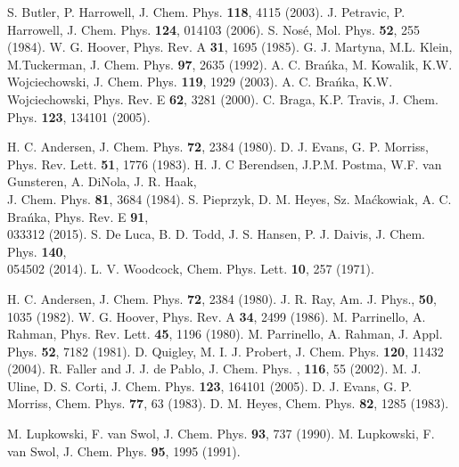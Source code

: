 \begin{thebibliography}{3}
\begin{spacing}{1.0}
 S. Butler, P. Harrowell, J. Chem. Phys. {\bf 118}, 4115 (2003).
 J. Petravic, P. Harrowell, J. Chem. Phys. {\bf 124}, 014103 (2006).
%
 S. Nos\'{e}, Mol. Phys. {\bf 52}, 255 (1984).
 W. G. Hoover, Phys. Rev. A {\bf 31}, 1695 (1985).
 G. J. Martyna, M.L. Klein, M.Tuckerman, J. Chem. Phys. {\bf 97}, 2635 (1992).
 A. C. Bra\'nka, M. Kowalik, K.W. Wojciechowski, J. Chem. Phys. {\bf 119}, 1929 (2003).
 A. C. Bra\'nka, K.W. Wojciechowski, Phys. Rev. E {\bf 62}, 3281 (2000).
 C. Braga, K.P. Travis, J. Chem. Phys. {\bf 123}, 134101 (2005).

 H. C. Andersen, J. Chem. Phys. {\bf 72}, 2384 (1980).
 D. J. Evans, G. P. Morriss, Phys. Rev. Lett. {\bf 51}, 1776 (1983).
%
 H. J. C Berendsen, J.P.M. Postma, W.F. van Gunsteren, A. DiNola, J. R. Haak, \\J. Chem. Phys. {\bf 81}, 3684 (1984).
 S. Pieprzyk, D. M. Heyes, Sz. Ma\'{c}kowiak, A. C. Bra\'nka, Phys. Rev. E {\bf 91}, \\033312 (2015).
 S. De Luca, B. D. Todd, J. S. Hansen, P. J. Daivis, J. Chem. Phys. {\bf 140}, \\054502 (2014).
 L. V. Woodcock, Chem. Phys. Lett. {\bf 10}, 257 (1971).

 H. C. Andersen, J. Chem. Phys. {\bf 72}, 2384 (1980).
 J. R. Ray, Am. J. Phys., {\bf 50}, 1035 (1982).
 W. G. Hoover, Phys. Rev. A {\bf 34}, 2499 (1986).
 M. Parrinello, A. Rahman, Phys. Rev. Lett. {\bf 45}, 1196 (1980).
 M. Parrinello, A. Rahman, J. Appl. Phys. {\bf 52}, 7182 (1981).
 D. Quigley, M. I. J. Probert, J. Chem. Phys. {\bf 120}, 11432 (2004).
 R. Faller and J. J. de Pablo, J. Chem. Phys. , {\bf 116}, 55 (2002).
 M. J. Uline, D. S. Corti, J. Chem. Phys. {\bf 123}, 164101 (2005).
 D. J. Evans, G. P. Morriss, Chem. Phys.  {\bf 77}, 63 (1983).
 D. M. Heyes, Chem. Phys. {\bf 82}, 1285 (1983).

 M. Lupkowski, F. van Swol, J. Chem. Phys. {\bf 93}, 737 (1990).
 M. Lupkowski, F. van Swol, J. Chem. Phys. {\bf 95}, 1995 (1991).
%
%
%
%



\end{spacing}
\end{thebibliography}
